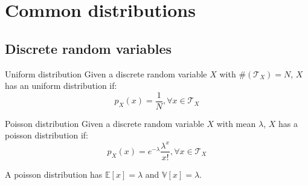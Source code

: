 \section{Common distributions}

\subsection{Discrete random variables}
\begin{descriptionlist}
    \item[Uniform distribution] 
        Given a discrete random variable $X$ with $\#(\mathcal{T}_X) = N$,
        $X$ has an uniform distribution if:
        \[ p_X(x) = \frac{1}{N}, \forall x \in \mathcal{T}_X \]
    
    \item[Poisson distribution] 
        Given a discrete random variable $X$ with mean $\lambda$,
        $X$ has a poisson distribution if:
        \[ p_X(x) = e^{-\lambda} \frac{\lambda^x}{x!}, \forall x \in \mathcal{T}_X \]

        A poisson distribution has $\mathbb{E}[x] = \lambda$ and $\mathbb{V}[x] = \lambda$.
\end{descriptionlist}


